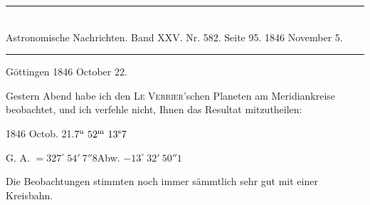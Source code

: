 \clearpage
\hypertarget{native-476-letter}{}
\begin{center}
\rule{0.55\linewidth}{0.4pt}\\[2pt]
Astronomische Nachrichten. Band XXV. Nr. 582. Seite 95. 1846 November 5.\\[2pt]
\rule{0.55\linewidth}{0.4pt}
\end{center}
\begin{flushright}Göttingen 1846 October 22.\end{flushright}

Gestern Abend habe ich den \textsc{Le Verrier}'schen Planeten am Meridiankreise beobachtet, und ich verfehle nicht, Ihnen das Resultat mitzutheilen:

\begin{center}
1846 Octob. 21.\quad $7^{\rm u}\ 52^{\rm m}\ 13^{\rm s}7$\par
G. A. $=327^\circ\ 54'\ 7''8$\qquad Abw. $-13^\circ\ 32'\ 50''1$
\end{center}

Die Beobachtungen stimmten noch immer sämmtlich sehr gut mit einer Kreisbahn.

